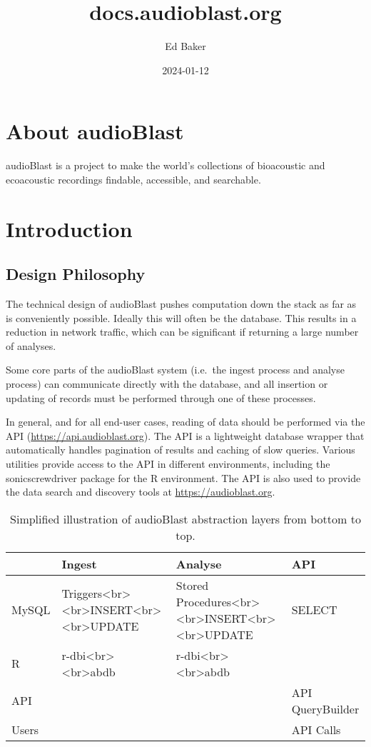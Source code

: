 \documentclass[
]{book}
\title{docs.audioblast.org}
\author{Ed Baker}
\date{2024-01-12}
\begin{document}
\maketitle

{
\setcounter{tocdepth}{1}
\tableofcontents
}
\hypertarget{about-audioblast}{%
\chapter{About audioBlast}\label{about-audioblast}}

audioBlast is a project to make the world's collections of bioacoustic and ecoacoustic recordings findable, accessible, and searchable.

\hypertarget{introduction}{%
\chapter{Introduction}\label{introduction}}

\hypertarget{design-philosophy}{%
\section{Design Philosophy}\label{design-philosophy}}

The technical design of audioBlast pushes computation down the stack as far as is conveniently possible. Ideally this will often be the database. This results in a reduction in network traffic, which can be significant if returning a large number of analyses.

Some core parts of the audioBlast system (i.e.~the ingest process and analyse process) can communicate directly with the database, and all insertion or updating of records must be performed through one of these processes.

In general, and for all end-user cases, reading of data should be performed via the API (\url{https://api.audioblast.org}). The API is a lightweight database wrapper that automatically handles pagination of results and caching of slow queries. Various utilities provide access to the API in different environments, including the sonicscrewdriver package for the R environment. The API is also used to provide the data search and discovery tools at \url{https://audioblast.org}.

\begin{table}

\caption{\label{tab:unnamed-chunk-1}Simplified illustration of audioBlast abstraction layers from 
  bottom to top.}
\centering
\begin{tabular}[t]{llll}
\toprule
  & Ingest & Analyse & API\\
\midrule
MySQL & Triggers<br><br>INSERT<br><br>UPDATE & Stored Procedures<br><br>INSERT<br><br>UPDATE & SELECT\\
R & r-dbi<br><br>abdb & r-dbi<br><br>abdb & \\
API &  &  & API QueryBuilder\\
Users &  &  & API Calls\\
\bottomrule
\end{tabular}
\end{table}
\end{document}
